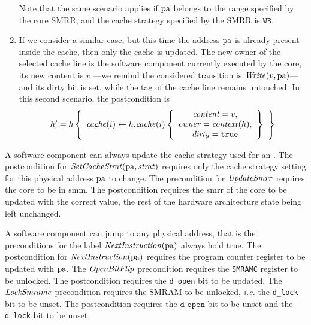 \begin{enumerate}
\[  \]
  Note that the same scenario applies if \( \mathrm{pa} \) belongs to the range
  specified by the core SMRR, and the cache strategy specified by the SMRR is
  \( \mathtt{WB} \).
\item If we consider a similar case, but this time the address \( \mathrm{pa} \) is
  already present inside the cache, then only the cache is updated.
  The new owner of the selected cache line is the software component currently
  executed by the core, its new content is \( v \) ---we remind the considered
  transition is \( \mathit{Write}(v, \mathrm{pa}) \)--- and its dirty bit is set,
  while the tag of the cache line remains untouched.
  In this second scenario, the postcondition is
  \[
    \begin{array}{l}
      h' = h \left\{
      \begin{array}{c}
        \mathit{cache}(i) \leftarrow h.\mathit{cache}(i) \left\{
        \begin{array}{c}
          \mathit{content} = v, \\
          \mathit{owner} = \mathit{context}(h),\\
          \mathit{dirty} = \mathtt{true}
        \end{array}
        \right\}
      \end{array}
      \right\}
    \end{array}
  \]
\end{enumerate}

A software component can always update the cache strategy used for an \IO.
%
The postcondition for \( \mathit{SetCacheStrat}(\mathrm{pa}, \mathit{strat}) \)
requires only the cache strategy setting for this physical address $\mathrm{pa}$ to
change. %
%
%
The precondition for \( \mathit{UpdateSmrr} \) requires the core to be in
\ac{smm}. %
%
%
The postcondition requires the \ac{smrr} of the core to be updated with the
correct value, the rest of the hardware architecture state being left unchanged.

A software component can jump to any physical address, that is the preconditions
for the label \( \mathit{NextInstruction}(\mathrm{pa}) \) always hold true.
%
The postcondition for \( \mathit{NextInstruction}(\mathrm{pa}) \) requires the
program counter register to be updated with \( \mathrm{pa} \).
%
The \( \mathit{OpenBitFlip} \) precondition requires the \texttt{SMRAMC} register
to be unlocked.
%
The postcondition requires the \texttt{d\_open} bit to be updated.
%
The $\mathit{LockSmramc}$ precondition requires the SMRAM to be unlocked,
\emph{i.e.} the \texttt{d\_lock} bit to be unset.
%
The postcondition requires the $\texttt{d\_open}$ bit to be unset and the
\texttt{d\_lock} bit to be unset.

